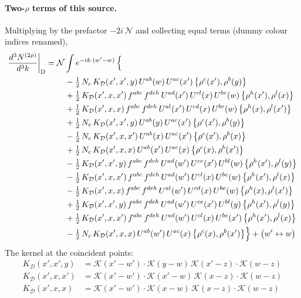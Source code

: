 \documentclass[10pt]{article}
\numberwithin{equation}{section}
\newcommand{\KK}{\mathcal K}
\newcommand{\NN}{\mathcal N}
\begin{document}
\paragraph{Two-$\rho$ terms of this source.} Multiplying by the prefactor $-2i\,\NN$ and collecting equal terms (dummy colour indices renamed),
\begin{align}
\frac{d^3N^{(2\rho)}}{d^3k}\bigg|_{\rm D}={}&\NN\int e^{-ik\cdot(w'-w)}\,\Big\{\notag\\
&\quad -\tfrac12\,N_{c}\,K_{\mathcal D}(x',x',y)\,U^{ab}(w)\,U^{ac}(x')\,\big\{\rho^{c}(x'),\rho^{b}(y)\big\}\notag\\
&\quad +\tfrac12\,K_{\mathcal D}(x',x,x')\,f^{abc}\,f^{deh}\,U^{ad}(x')\,U^{cl}(x)\,U^{be}(w)\,\big\{\rho^{h}(x'),\rho^{l}(x)\big\}\notag\\
&\quad +\tfrac12\,K_{\mathcal D}(x',x,x)\,f^{abc}\,f^{deh}\,U^{al}(x')\,U^{cd}(x)\,U^{be}(w)\,\big\{\rho^{h}(x),\rho^{l}(x')\big\}\notag\\
&\quad +\tfrac12\,N_{c}\,K_{\mathcal D}(x',x',y)\,U^{ab}(y)\,U^{ac}(x')\,\big\{\rho^{c}(x'),\rho^{b}(y)\big\}\notag\\
&\quad -\tfrac12\,N_{c}\,K_{\mathcal D}(x',x,x')\,U^{ab}(x)\,U^{ac}(x')\,\big\{\rho^{c}(x'),\rho^{b}(x)\big\}\notag\\
&\quad +\tfrac12\,N_{c}\,K_{\mathcal D}(x',x,x)\,U^{ab}(x')\,U^{ac}(x)\,\big\{\rho^{c}(x),\rho^{b}(x')\big\}\notag\\
&\quad -\tfrac12\,K_{\mathcal D}(x',x',y)\,f^{abc}\,f^{deh}\,U^{ad}(w')\,U^{ce}(x')\,U^{bl}(w)\,\big\{\rho^{h}(x'),\rho^{l}(y)\big\}\notag\\
&\quad -\tfrac12\,K_{\mathcal D}(x',x,x')\,f^{abc}\,f^{deh}\,U^{ad}(w')\,U^{cl}(x)\,U^{be}(w)\,\big\{\rho^{h}(x'),\rho^{l}(x)\big\}\notag\\
&\quad -\tfrac12\,K_{\mathcal D}(x',x,x)\,f^{abc}\,f^{deh}\,U^{al}(w')\,U^{cd}(x)\,U^{be}(w)\,\big\{\rho^{h}(x),\rho^{l}(x')\big\}\notag\\
&\quad +\tfrac12\,K_{\mathcal D}(x',x',y)\,f^{abc}\,f^{deh}\,U^{ad}(w')\,U^{ce}(x')\,U^{bl}(y)\,\big\{\rho^{h}(x'),\rho^{l}(y)\big\}\notag\\
&\quad +\tfrac12\,K_{\mathcal D}(x',x,x')\,f^{abc}\,f^{deh}\,U^{ad}(w')\,U^{cl}(x)\,U^{be}(x')\,\big\{\rho^{h}(x'),\rho^{l}(x)\big\}\notag\\
&\quad -\tfrac12\,N_{c}\,K_{\mathcal D}(x',x,x)\,U^{ab}(w')\,U^{ac}(x)\,\big\{\rho^{c}(x),\rho^{b}(x')\big\}\Big\}+\big(w'\leftrightarrow w\big)\label{T:eq:res-D}
\end{align}
The kernel at the coincident points:
\begin{align*}
K_{\mathcal D}(x',x',y)&=\KK(x'-w')\cdot\KK(y-w)\,\KK(x'-z)\cdot\KK(w-z)\\K_{\mathcal D}(x',x,x')&=\KK(x'-w')\cdot\KK(x'-w)\,\KK(x-z)\cdot\KK(w-z)\\K_{\mathcal D}(x',x,x)&=\KK(x'-w')\cdot\KK(x-w)\,\KK(x-z)\cdot\KK(w-z)
\end{align*}
\end{document}
